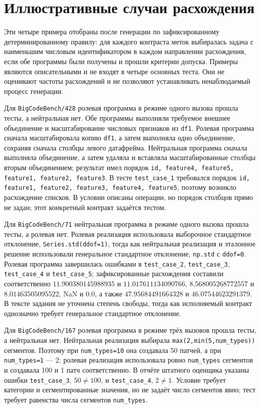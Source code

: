 \section{Иллюстративные случаи расхождения}
\label{sec:heldout-cases-ru}

Эти четыре примера отобраны после генерации по зафиксированному детерминированному правилу: для каждого контраста меток выбиралась задача с наименьшим числовым идентификатором в каждом направлении расхождения, если обе программы были получены и прошли критерии допуска. Примеры являются описательными и не входят в четыре основных теста. Они не оценивают частоты расхождений и не позволяют устанавливать ненаблюдаемый процесс генерации.

Для \texttt{BigCodeBench/428} ролевая программа в режиме одного вызова прошла тесты, а нейтральная нет. Обе программы выполняли требуемое внешнее объединение и масштабирование числовых признаков из \texttt{df1}. Ролевая программа сначала масштабировала копию \texttt{df1}, а затем выполняла одно объединение, сохраняя сначала столбцы левого датафрейма. Нейтральная программа сначала выполняла объединение, а затем удаляла и вставляла масштабированные столбцы вторым объединением; результат имел порядок \texttt{id, feature4, feature5, feature1, feature2, feature3}. В тесте \texttt{test\_case\_1} требовался порядок \texttt{id, feature1, feature2, feature3, feature4, feature5}, поэтому возникло расхождение списков. В условии описаны операции, но порядок столбцов прямо не задан; этот конкретный контракт задаётся тестом.

Для \texttt{BigCodeBench/71} нейтральная программа в режиме одного вызова прошла тесты, а ролевая нет. Ролевая реализация использовала выборочное стандартное отклонение, \texttt{Series.std(ddof=1)}, тогда как нейтральная реализация и эталонное решение использовали генеральное стандартное отклонение, \texttt{np.std} с \texttt{ddof=0}. Ролевая программа завершилась ошибками в \texttt{test\_case\_2}, \texttt{test\_case\_3}, \texttt{test\_case\_4} и \texttt{test\_case\_5}; зафиксированные расхождения составили соответственно $11.900380145988935$ и $11.017611134090766$, $8.568005268772557$ и $8.01463505095522$, NaN и $0.0$, а также $47.95684491664328$ и $46.07544623291379$. В тексте задания не уточнена степень свободы, тогда как исполняемый контракт однозначно требует генеральное стандартное отклонение.

Для \texttt{BigCodeBench/167} ролевая программа в режиме трёх вызовов прошла тесты, а нейтральная нет. Нейтральная реализация выбирала \texttt{max(2,min(5,num\_types))} сегментов. Поэтому при \texttt{num\_types=10} она создавала 50 патчей, а при \texttt{num\_types=1} --- 2; ролевая реализация использовала ровно \texttt{num\_types} сегментов и создавала 100 и 1 патч соответственно. В отчёте штатного оценщика указаны ошибки \texttt{test\_case\_3}, $50\mathrel{\ne}100$, и \texttt{test\_case\_4}, $2\mathrel{\ne}1$. Условие требует категории и сегментированные значения, но не задаёт число сегментов явно; тест требует равенства числа сегментов \texttt{num\_types}.

